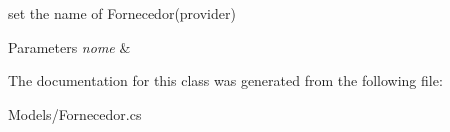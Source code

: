 set the name of Fornecedor(provider) 


\begin{DoxyParams}{Parameters}
{\em nome} & \\
\hline
\end{DoxyParams}


The documentation for this class was generated from the following file\+:\begin{DoxyCompactItemize}
\item 
Models/Fornecedor.\+cs\end{DoxyCompactItemize}
